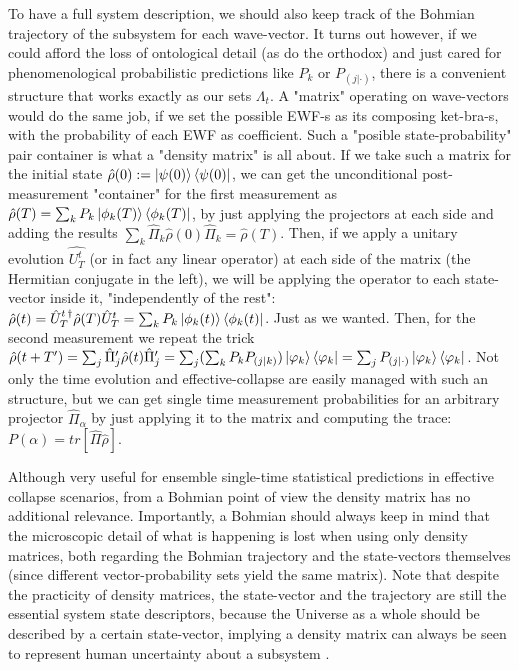 \documentclass[11pt, a4paper]{article} %
\begin{document}
To have a full system description, we should also keep track of the Bohmian trajectory of the subsystem for each wave-vector. It turns out however, if we could afford the loss of ontological detail (as do the orthodox) and just cared for phenomenological probabilistic predictions like $P_k$ or $P_{(j|\cdot)}$, there is a convenient structure that works exactly as our sets $\Lambda_t$. A "matrix" operating on wave-vectors would do the same job, if we set the possible EWF-s as its composing ket-bra-s, with the probability of each EWF as coefficient. Such a "posible state-probability" pair container is what a "density matrix" \cite{vonNeumann, Durr, Holland} is all about. 
If we take such a matrix for the initial state $\hat{\rho}(0):=\ket{\psi(0)}\bra{\psi(0)}$, we can get the unconditional post-measurement "container" for the first measurement as $\hat{\rho}(T)=\sum_k P_k\ket{\phi_k(T)}\bra{\phi_k(T)}$, by just applying the projectors at each side and adding the results $\sum_k\hat{\Pi}_k \hat{\rho}(0) \hat{\Pi}_k=\hat{\rho}(T)$. Then, if we apply a unitary evolution $\hat{U_T^t}$ (or in fact any linear operator) at each side of the matrix (the Hermitian conjugate in the left), we will be applying the operator to each state-vector inside it, "independently of the rest": $\hat{\rho}(t)=\hat{U}_T^{t\,\dagger}\hat{\rho}(T)\hat{U}_T^{t}=\sum_k P_k\ket{\phi_k(t)}\bra{\phi_k(t)}$. Just as we wanted. Then, for the second measurement we repeat the trick $\hat{\rho}(t+T')=\sum_j\hat{\Pi}'_j \hat{\rho}(t) \hat{\Pi}'_j=\sum_j (\sum_k P_kP_{(j|k)})\ket{\varphi_k}\bra{\varphi_k}=\sum_j P_{(j|\cdot)}\ket{\varphi_k}\bra{\varphi_k}$. Not only the time evolution and effective-collapse are easily managed with such an structure, but we can get single time measurement probabilities for an arbitrary projector $\hat{\Pi}_\alpha$ by just applying it to the matrix and computing the trace: $P(\alpha)=tr[\hat{\Pi}\hat{\rho}]$.

Although very useful for ensemble single-time statistical predictions in effective collapse scenarios, from a Bohmian point of view the density matrix has no additional relevance. Importantly, a Bohmian should always keep in mind that the microscopic detail of what is happening is lost when using only density matrices, both regarding the Bohmian trajectory and the state-vectors themselves (since different vector-probability sets yield the same matrix). Note that despite the practicity of density matrices, the state-vector and the trajectory are still the essential system state descriptors, because the Universe as a whole should be described by a certain state-vector, implying a density matrix can always be seen to represent human uncertainty about a subsystem \cite{Generalized}.\vspace{-0.2cm}
\end{document}
